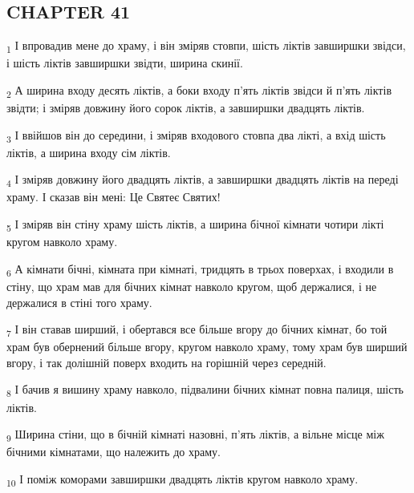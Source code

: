 \subsection{CHAPTER 41}
\begin{tcolorbox}
\textsubscript{1} І впровадив мене до храму, і він зміряв стовпи, шість ліктів завширшки звідси, і шість ліктів завширшки звідти, ширина скинії.
\end{tcolorbox}
\begin{tcolorbox}
\textsubscript{2} А ширина входу десять ліктів, а боки входу п'ять ліктів звідси й п'ять ліктів звідти; і зміряв довжину його сорок ліктів, а завширшки двадцять ліктів.
\end{tcolorbox}
\begin{tcolorbox}
\textsubscript{3} І ввійшов він до середини, і зміряв входового стовпа два лікті, а вхід шість ліктів, а ширина входу сім ліктів.
\end{tcolorbox}
\begin{tcolorbox}
\textsubscript{4} І зміряв довжину його двадцять ліктів, а завширшки двадцять ліктів на переді храму. І сказав він мені: Це Святеє Святих!
\end{tcolorbox}
\begin{tcolorbox}
\textsubscript{5} І зміряв він стіну храму шість ліктів, а ширина бічної кімнати чотири лікті кругом навколо храму.
\end{tcolorbox}
\begin{tcolorbox}
\textsubscript{6} А кімнати бічні, кімната при кімнаті, тридцять в трьох поверхах, і входили в стіну, що храм мав для бічних кімнат навколо кругом, щоб держалися, і не держалися в стіні того храму.
\end{tcolorbox}
\begin{tcolorbox}
\textsubscript{7} І він ставав ширший, і обертався все більше вгору до бічних кімнат, бо той храм був обернений більше вгору, кругом навколо храму, тому храм був ширший вгору, і так долішній поверх входить на горішній через середній.
\end{tcolorbox}
\begin{tcolorbox}
\textsubscript{8} І бачив я вишину храму навколо, підвалини бічних кімнат повна палиця, шість ліктів.
\end{tcolorbox}
\begin{tcolorbox}
\textsubscript{9} Ширина стіни, що в бічній кімнаті назовні, п'ять ліктів, а вільне місце між бічними кімнатами, що належить до храму.
\end{tcolorbox}
\begin{tcolorbox}
\textsubscript{10} І поміж коморами завширшки двадцять ліктів кругом навколо храму.
\end{tcolorbox}
